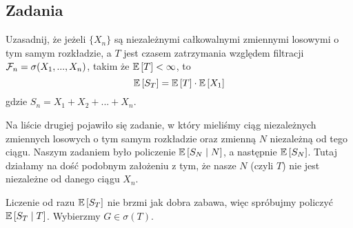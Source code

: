 \subsection{Zadania}

\begin{problem}
  Uzasadnij, że jeżeli $\{X_n\}$ są niezależnymi całkowalnymi zmiennymi losowymi o tym samym rozkładzie, a $T$ jest czasem zatrzymania względem filtracji $\mathcal{F}_n=\sigma(X_1,...,X_n)$, takim że $\expected{T}<\infty$, to 
  $$\expected{S_T}=\expected{T}\cdot\expected{X_1}$$
  gdzie $S_n=X_1+X_2+...+X_n$.
\end{problem}

\begin{solution}
  Na liście drugiej pojawiło się zadanie, w który mieliśmy ciąg niezależnych zmiennych losowych o tym samym rozkładzie oraz zmienną $N$ niezależną od tego ciągu. Naszym zadaniem było policzenie $\expected{S_N}{N}$, a następnie $\expected{S_N}$. Tutaj działamy na dość podobnym założeniu z tym, że nasze $N$ (czyli $T$) nie jest niezależne od danego ciągu $X_n$.

  Liczenie od razu $\expected{S_T}$ nie brzmi jak dobra zabawa, więc spróbujmy policzyć $\expected{S_T}{T}$. Wybierzmy $G\in\sigma(T)$.
\end{solution}

